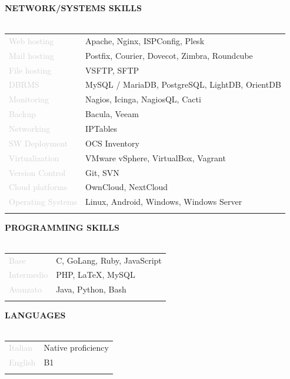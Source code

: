 \documentclass{article}
\begin{document}
\textbf{\textcolor{deepblue}{NETWORK/SYSTEMS SKILLS}} \\\\ \hfill
\begin{tabular}{ R{4cm} l }
	\textcolor{lightgray}{Web hosting}       & Apache, Nginx, ISPConfig, Plesk                \\ \hfill
	\textcolor{lightgray}{Mail hosting}      & Postfix, Courier, Dovecot, Zimbra, Roundcube   \\ \hfill
	\textcolor{lightgray}{File hosting}      & VSFTP, SFTP                                    \\ \hfill
	\textcolor{lightgray}{DBRMS}             & MySQL / MariaDB, PostgreSQL, LightDB, OrientDB \\ \hfill
	\textcolor{lightgray}{Monitoring}        & Nagios, Icinga, NagiosQL, Cacti                \\ \hfill
	\textcolor{lightgray}{Backup}            & Bacula, Veeam                                  \\ \hfill
	\textcolor{lightgray}{Networking}        & IPTables                                       \\ \hfill
	\textcolor{lightgray}{SW Deployment}     & OCS Inventory                                  \\ \hfill
	\textcolor{lightgray}{Virtualization}    & VMware vSphere, VirtualBox, Vagrant            \\ \hfill
	\textcolor{lightgray}{Version Control}   & Git, SVN                                       \\ \hfill
	\textcolor{lightgray}{Cloud platforms}   & OwnCloud, NextCloud                            \\ \hfill
	\textcolor{lightgray}{Operating Systems} & Linux, Android, Windows, Windows Server        \\ \hfill
\end{tabular}

\textbf{\textcolor{deepblue}{PROGRAMMING SKILLS}} \\\\ \hfill
\begin{tabular}{ R{4cm} l }
	\textcolor{lightgray}{Base}       & C, GoLang, Ruby, JavaScript \\ \hfill
	\textcolor{lightgray}{Intermedio} & PHP, LaTeX, MySQL           \\ \hfill
	\textcolor{lightgray}{Avanzato}   & Java, Python, Bash          \\ \hfill
\end{tabular}

\textbf{\textcolor{deepblue}{LANGUAGES}} \\\\ \hfill
\begin{tabular}{ R{4cm} l }
	\textcolor{lightgray}{Italian} & Native proficiency \\ \hfill
	\textcolor{lightgray}{English} & B1                 \\ \hfill
\end{tabular}
\end{document}
